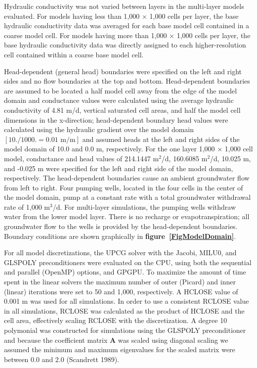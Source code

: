 \documentclass[12pt]{article}
\begin{document}
Hydraulic conductivity was not varied between layers in the multi-layer models evaluated. For models having less than 1,000 $\times$ 1,000 cells per layer, the base hydraulic conductivity data was averaged for each base model cell contained in a coarse model cell. For models having more than 1,000 $\times$ 1,000 cells per layer, the base hydraulic conductivity data was directly assigned to each higher-resolution cell contained within a coarse base model cell.

Head-dependent (general head) boundaries were specified on the left and right sides and no flow boundaries at the top and bottom. Head-dependent boundaries are assumed to be located a half model cell away from the edge of the model domain and conductance values were calculated using the average hydraulic conductivity of 4.81 m/d, vertical saturated cell areas, and half the model cell dimensions in the x-direction; head-dependent boundary head values were calculated using the hydraulic gradient over the model domain \color{blue}$\left [ 10. / 1000. = 0.01 \text{ m/m} \right]$ \color{black}and assumed heads at the left and right sides of the model domain of 10.0 and 0.0 m, respectively. For the one layer 1,000 $\times$ 1,000 cell model, conductance and head values of 214.1447 m$^{2}$/d, 160.6085 m$^{2}$/d, 10.025 m, and -0.025 m were specified for the left and right side of the model domain, respectively. The head-dependent boundaries cause an ambient groundwater flow from left to right. Four pumping wells, located in the four cells in the center of the model domain, pump at a constant rate with a total groundwater withdrawal rate of 1,000 m$^3$/d. For multi-layer simulations, the pumping wells withdraw water from the lower model layer. There is no recharge or evapotranspiration; all groundwater flow to the wells is provided by the head-dependent boundaries. Boundary conditions are shown graphically in \textbf{figure~\ref{FigModelDomain}}.

For all model discretizations, the UPCG solver with the Jacobi, MILU0, and GLSPOLY preconditioners were evaluated on the CPU, using both the sequential and parallel (OpenMP) options, and GPGPU. To maximize the amount of time spent in the linear solvers the maximum number of outer (Picard) and inner (linear) iterations were set to 50 and 1,000, respectively. A HCLOSE value of 0.001 m was used for all simulations. In order to use a consistent RCLOSE value in all simulations, RCLOSE was calculated as the product of HCLOSE and the cell area, effectively scaling RCLOSE with the discretization. A degree 10 polymonial was constructed for simulations using the GLSPOLY preconditioner and because the coefficient matrix $\mathbf{A}$ was scaled using diagonal scaling we assumed the minimum and maximum eigenvalues for the scaled matrix were between 0.0 and 2.0 (Scandrett 1989).
\end{document}
